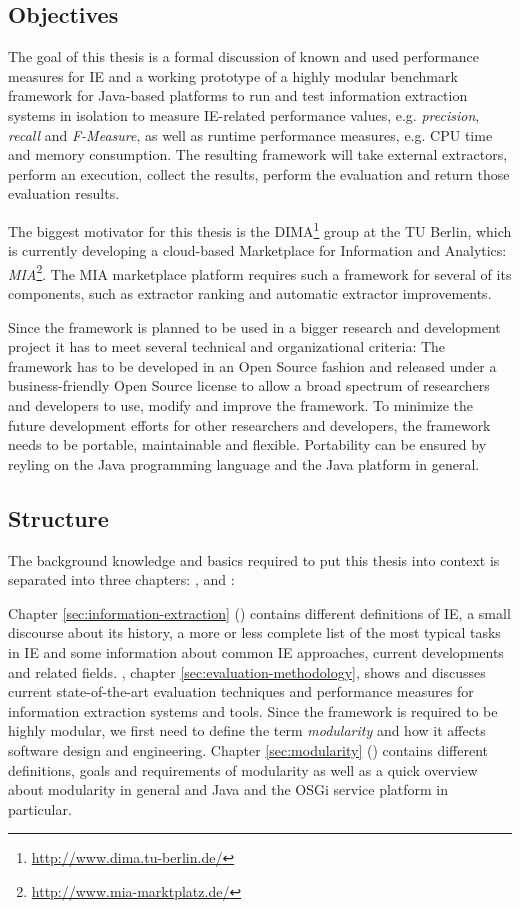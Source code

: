 \subsection{Objectives}
The goal of this thesis is a formal discussion of known and used performance measures for IE and a working prototype of a highly modular benchmark framework for Java-based platforms to run and test information extraction systems in isolation to measure IE-related performance values, e.g. \textit{precision}, \textit{recall} and \textit{F-Measure}, as well as runtime performance measures, e.g. CPU time and memory consumption. The resulting framework will take external extractors, perform an execution, collect the results, perform the evaluation and return those evaluation results.

The biggest motivator for this thesis is the \gls{DIMA}\footnote{\url{http://www.dima.tu-berlin.de/}} group at the TU Berlin, which is currently developing a cloud-based Marketplace for Information and Analytics: \textit{MIA}\footnote{\url{http://www.mia-marktplatz.de/}}. The MIA marketplace platform requires such a framework for several of its components, such as extractor ranking and automatic extractor improvements.

Since the framework is planned to be used in a bigger research and development project it has to meet several technical and organizational criteria: The framework has to be developed in an Open Source fashion and released under a business-friendly Open Source license to allow a broad spectrum of researchers and developers to use, modify and improve the framework. To minimize the future development efforts for other researchers and developers, the framework needs to be portable, maintainable and flexible. Portability can be ensured by reyling on the Java programming language and the Java platform in general.

\subsection{Structure}
The background knowledge and basics required to put this thesis into context is separated into three chapters: ,  and :

Chapter \ref{sec:information-extraction} () contains different definitions of \gls{IE}, a small discourse about its history, a more or less complete list of the most typical tasks in \gls{IE} and some information about common \gls{IE} approaches, current developments and related fields. , chapter \ref{sec:evaluation-methodology}, shows and discusses current state-of-the-art evaluation techniques and performance measures for information extraction systems and tools. Since the framework is required to be highly modular, we first need to define the term \textit{modularity} and how it affects software design and engineering. Chapter \ref{sec:modularity} () contains different definitions, goals and requirements of modularity as well as a quick overview about modularity in general and Java and the \gls{OSGi} service platform in particular.

